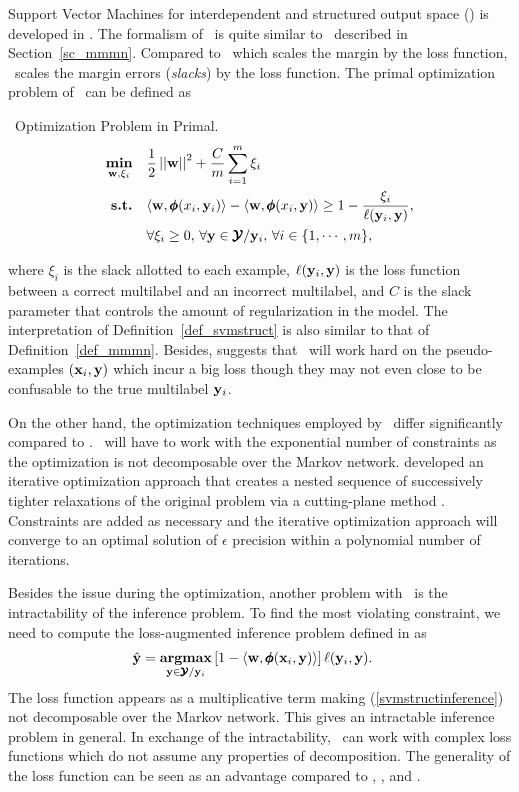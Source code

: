 {Support Vector Machines for interdependent and structured output space (\svmstruct) is developed in \citep{THJA04,TJTA05}.
The formalism of \svmstruct\ is quite similar to \mmmn\ described in Section~\ref{sc_mmmn}.
Compared to \mmmn\ which scales the margin by the loss function, \svmstruct\ scales the margin errors ({\em slacks}) by the loss function.
The primal optimization problem of \svmstruct\ can be defined as
\begin{definition}{\svmstruct\ Optimization Problem in Primal.}\label{def_svmstruct}
	\begin{align*}
		\underset{\mathbf {w},\xi_i}{\textbf{min}} & \quad\frac{1}{2}\left|\left| \mathbf {w} \right|\right|^2 + \frac{C}{m}\sum_{i=1}^{m}\xi_i \\
		\textbf{s.t.} & \quad\langle \mathbf {w}, \pmb \phi(x_i,\mathbf {y}_i) \rangle - \langle \mathbf {w}, \pmb \phi(x_i,\mathbf {y}) \rangle \ge 1-\frac{\xi_i}{\mathbf {\ell}(\mathbf {y}_i,\mathbf {y})},\\
		& \quad \forall \xi_i\ge0,\, \forall \mathbf {y}\in\pmb {\mathcal{Y}}/\mathbf {y}_i,\, \forall i\in\{1,\cdots,m\},
	\end{align*}
\end{definition}
\noindent
where $\xi_i$ is the slack allotted to each example, $\mathbf {\ell}(\mathbf {y}_i,\mathbf {y})$ is the loss function between a correct multilabel and an incorrect multilabel, and $C$ is the slack parameter that controls the amount of regularization in the model.
The interpretation of Definition~\ref{def_svmstruct} is also similar to that of Definition~\ref{def_mmmn}.
Besides, \citet{THJA04} suggests that \mmmn\ will work hard on the pseudo-examples $(\mathbf {x}_i,\mathbf {y})$ which incur a big loss though they may not even close to be confusable to the true multilabel $\mathbf {y}_i$.

On the other hand, the optimization techniques employed by \svmstruct\ differ significantly compared to \mmmn.
\svmstruct\ will have to work with the exponential number of constraints as the optimization is not decomposable over the Markov network.
\citet{THJA04} developed an iterative optimization approach that creates a nested sequence of successively tighter relaxations of the original problem via a cutting-plane method \citep{Bishop07,JFY09}.
Constraints are added as necessary and the iterative optimization approach will converge to an optimal solution of $\epsilon$ precision within a polynomial number of iterations.

Besides the issue during the optimization, another problem with \svmstruct\ is the intractability of the inference problem.
To find the most violating constraint, we need to compute the loss-augmented inference problem defined in \citep{TJTA05} as
\begin{align}
	\hat{\mathbf {y}} = \underset{\mathbf {y}\in\pmb {\mathcal{Y}}/\mathbf {y}_i}{\textbf{argmax}} &\, [1-\langle \mathbf {w}, \pmb \phi(\mathbf {x}_i,\mathbf {y}) \rangle]\,\mathbf {\ell}(\mathbf {y}_i,\mathbf {y}). \label{svmstructinference}
\end{align}
The loss function appears as a multiplicative term making (\ref{svmstructinference}) not decomposable over the Markov network.
This gives an intractable inference problem in general.
In exchange of the intractability, \svmstruct\ can work with complex loss functions which do not assume any properties of decomposition.
The generality of the loss function can be seen as an advantage compared to \crf, \mmmn, and \mmcrf.



}
